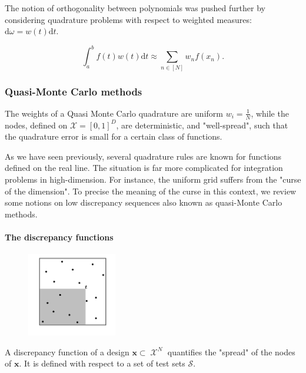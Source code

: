 \documentclass[twoside,11pt]{article}
\DeclareMathOperator{\X}{\mathcal{X}}
\begin{document}
The notion of orthogonality between polynomials was pushed further by considering quadrature problems with respect to weighted measures: $\mathrm{d}\omega = w(t) \mathrm{d} t$.

\begin{equation}
\int_{a}^{b}f(t)w(t)\mathrm{d}t \approx \sum\limits_{n \in [N]} w_{n}f(x_{n}).
\end{equation}





\subsubsection{Quasi-Monte Carlo methods}
The weights of a Quasi Monte Carlo quadrature are uniform $\displaystyle w_{i} = \frac{1}{N}$, while the nodes, defined on $\mathcal{X} = [0,1]^{D}$, are deterministic, and "well-spread", such that the quadrature error is small for a certain class of functions. 
\clearpage




As we have seen previously, several quadrature rules are known for functions defined on the real line. The situation is far more complicated for integration problems in high-dimension. For instance, the uniform grid suffers from the "curse of the dimension". To precise the meaning of the curse in this context, we review some notions on low discrepancy sequences also known as quasi-Monte Carlo methods.


 
\paragraph{The discrepancy functions}

\begin{figure}
\centering
\includegraphics[width= 0.35\textwidth]{img/discrepancy/local_disc.png}
\caption{\label{fig:local_discrepancy}}
\end{figure}

 A discrepancy function of a design $\bm{x} \subset \X^{N}$ quantifies the "spread" of the nodes of $\bm{x}$. It is defined with respect to a set of test sets $\mathcal{S}$.
\end{document}
